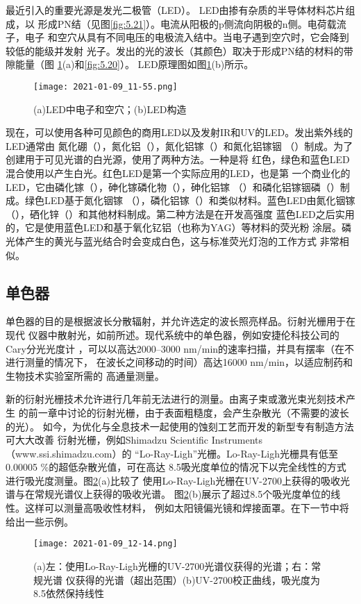 最近引入的重要光源是发光二极管（LED）。 LED由掺有杂质的半导体材料芯片组成，以
形成PN结（见图\ref{fig:5.21}）。电流从阳极的p侧流向阴极的n侧。电荷载流子，电子
和空穴从具有不同电压的电极流入结中。当电子遇到空穴时，它会降到较低的能级并发射
光子。发出的光的波长（其颜色）取决于形成PN结的材料的带隙能量（图
\ref{fig:5.15}(a)和\ref{fig:5.20}）。 LED原理图如图\ref{fig:5.15}(b)所示。
\begin{figure}[htpb]
    \centering
    \texttt{[image: 2021-01-09\_11-55.png]}
    \caption{(a)LED中电子和空穴；(b)LED构造}
    \label{fig:5.15}
\end{figure}

现在，可以使用各种可见颜色的商用LED以及发射IR和UV的LED。发出紫外线的LED通常由
氮化硼（），氮化铝（），氮化铝镓（）和氮化铝镓铟
（）制成。为了创建用于可见光谱的白光源，使用了两种方法。一种是将
红色，绿色和蓝色LED混合使用以产生白光。红色LED是第一个实际应用的LED，也是第
一个商业化的LED，它由磷化镓（），砷化镓磷化物（），砷化铝镓
（）和磷化铝镓铟磷（）制成。绿色LED基于氮化铟镓
（），磷化铝镓（）和类似材料。蓝色LED由氮化铟镓
（），硒化锌（）和其他材料制成。第二种方法是在开发高强度
蓝色LED之后实用的，它是使用蓝色LED和基于氧化钇铝（也称为YAG）等材料的荧光粉
涂层。磷光体产生的黄光与蓝光结合时会变成白色，这与标准荧光灯泡的工作方式
非常相似。
\subsection{单色器}
单色器的目的是根据波长分散辐射，并允许选定的波长照亮样品。衍射光栅用于在现代
仪器中散射光，如前所述。现代系统中的单色器，例如安捷伦科技公司的Cary分光光度计
，可以以高达2000--3000 nm/min的速率扫描，并具有摆率（在不进行测量的情况下，
在波长之间移动的时间）高达16000 nm/min，以适应制药和生物技术实验室所需的
高通量测量。

新的衍射光栅技术允许进行几年前无法进行的测量。由离子束或激光束光刻技术产生
的前一章中讨论的衍射光栅，由于表面粗糙度，会产生杂散光（不需要的波长的光）。
如今，为优化与全息技术一起使用的蚀刻工艺而开发的新型专有制造方法可大大改善
衍射光栅，例如Shimadzu Scientific Instruments（www.ssi.shimadzu.com）的
“Lo-Ray-Ligh”光栅。Lo-Ray-Ligh光栅具有低至0.00005 \%的超低杂散光值，可在高达
8.5吸光度单位的情况下以完全线性的方式进行吸光度测量。图\ref{fig:5.16}(a)比较了
使用Lo-Ray-Ligh光栅在UV-2700上获得的吸收光谱与在常规光谱仪上获得的吸收光谱。
图\ref{fig:5.16}(b)展示了超过8.5个吸光度单位的线性。这样可以测量高吸收性材料，
例如太阳镜偏光镜和焊接面罩。在下一节中将给出一些示例。
\begin{figure}[htpb]
    \centering
    \texttt{[image: 2021-01-09\_12-14.png]}
    \caption{(a)左：使用Lo-Ray-Ligh光栅的UV-2700光谱仪获得的光谱；右：常规光谱
    仪获得的光谱（超出范围）(b)UV-2700校正曲线，吸光度为8.5依然保持线性}
    \label{fig:5.16}
\end{figure}
